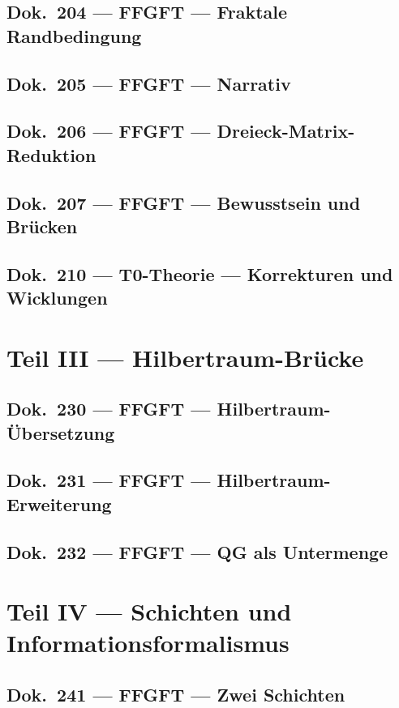 	\chapter{Dok.~204 --- FFGFT — Fraktale Randbedingung}
	
	\chapter{Dok.~205 --- FFGFT — Narrativ}
	
	\chapter{Dok.~206 --- FFGFT — Dreieck-Matrix-Reduktion}
	
	\chapter{Dok.~207 --- FFGFT — Bewusstsein und Brücken}
	
	\chapter{Dok.~210 --- T0-Theorie — Korrekturen und Wicklungen}
	
	\part{Teil III --- Hilbertraum-Brücke}
	\chapter{Dok.~230 --- FFGFT — Hilbertraum-Übersetzung}
	
	\chapter{Dok.~231 --- FFGFT — Hilbertraum-Erweiterung}
	
	\chapter{Dok.~232 --- FFGFT — QG als Untermenge}
	
	\part{Teil IV --- Schichten und Informationsformalismus}
	\chapter{Dok.~241 --- FFGFT — Zwei Schichten}
	
